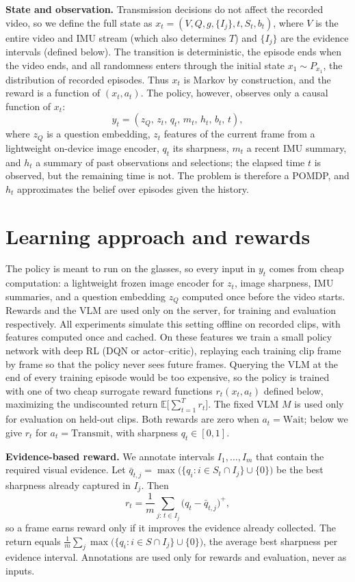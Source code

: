 \documentclass[
  11pt,
]{article}
\begin{document}
\textbf{State and observation.} Transmission decisions do not affect the
recorded video, so we define the full state as
$x_t=(V,Q,g,\{I_j\},t,S_t,b_t)$, where $V$ is the entire video and IMU
stream (which also determines $T$) and $\{I_j\}$ are the evidence
intervals (defined below). The transition is deterministic, the episode
ends when the video ends, and all randomness enters through the initial
state
$x_1\sim P_{x_1}$, the distribution of recorded episodes. Thus $x_t$ is
Markov by construction, and the reward is a function of $(x_t,a_t)$.
The policy, however, observes only a causal function of $x_t$:
\[
y_t=(z_Q,\,z_t,\,q_t,\,m_t,\,h_t,\,b_t,\,t),
\]
where $z_Q$ is a question embedding, $z_t$ features of the current frame
from a lightweight on-device image encoder, $q_t$ its sharpness, $m_t$ a recent IMU summary, and $h_t$ a summary of
past observations and selections; the elapsed time $t$ is observed,
but the remaining time is not. The problem is therefore a POMDP, and
$h_t$ approximates the belief over episodes given the history.

\section{Learning approach and rewards}

The policy is meant to run on the glasses, so every input in $y_t$
comes from cheap computation: a lightweight frozen image encoder for
$z_t$, image sharpness, IMU summaries, and a question embedding $z_Q$
computed once before the video starts. Rewards and the VLM are used
only on the server, for training and evaluation respectively. All
experiments simulate this setting offline on recorded clips, with
features computed once and cached. On these features we train a small
policy network with deep RL (DQN or actor--critic), replaying each
training clip frame by frame so that the policy never sees future
frames. Querying the VLM at the end of every training episode would be
too expensive, so the policy is trained with one of two cheap surrogate
reward functions $r_t(x_t,a_t)$ defined below, maximizing the
undiscounted return $\mathbb{E}\bigl[\sum_{t=1}^{T}r_t\bigr]$. The
fixed VLM $M$ is used only for evaluation on held-out clips. Both
rewards are zero when $a_t=\mathrm{Wait}$; below we give $r_t$ for
$a_t=\mathrm{Transmit}$, with sharpness $q_t\in[0,1]$.

\textbf{Evidence-based reward.} We annotate intervals
$I_1,\ldots,I_m$ that contain the required visual evidence. Let
$\bar q_{t,j}=\max\bigl(\{q_i:i\in S_t\cap I_j\}\cup\{0\}\bigr)$ be the
best sharpness already captured in $I_j$. Then
\[
r_t=\frac{1}{m}\sum_{j:\,t\in I_j}\bigl(q_t-\bar q_{t,j}\bigr)^{+},
\]
so a frame earns reward only if it improves the evidence already
collected. The return equals
$\frac{1}{m}\sum_{j}\max\bigl(\{q_i:i\in S\cap I_j\}\cup\{0\}\bigr)$,
the average best sharpness per evidence interval. Annotations are used
only for rewards and evaluation, never as inputs.
\end{document}

